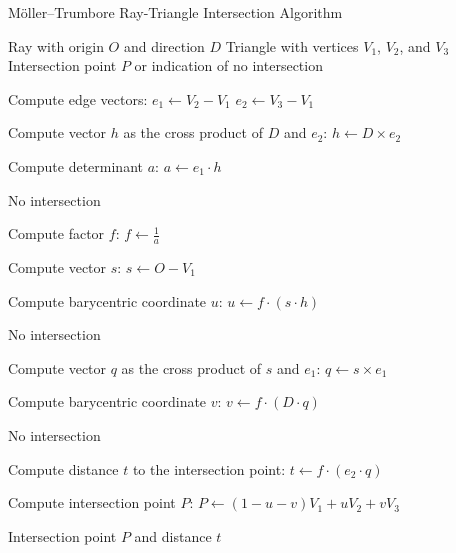 \documentclass[11pt, a4paper,oneside,chapterprefix=false]{scrbook}
\begin{document}
\vspace{10pt}

\begin{algorithm}[H]
\caption{Möller–Trumbore Ray-Triangle Intersection Algorithm}\label{alg:ray_triangle_intersection}
\begin{algorithmic}
\Require Ray with origin \( O \) and direction \( D \)
\Require Triangle with vertices \( V_1 \), \( V_2 \), and \( V_3 \)
\Ensure Intersection point \( P \) or indication of no intersection

\State Compute edge vectors:
\State \hspace{0.5cm} \( e_1 \gets V_2 - V_1 \)
\State \hspace{0.5cm} \( e_2 \gets V_3 - V_1 \)

\State Compute vector \( h \) as the cross product of \( D \) and \( e_2 \):
\State \hspace{0.5cm} \( h \gets D \times e_2 \)

\State Compute determinant \( a \):
\State \hspace{0.5cm} \( a \gets e_1 \cdot h \)

    \State \Return No intersection  
\EndIf

\State Compute factor \( f \):
\State \hspace{0.5cm} \( f \gets \frac{1}{a} \)

\State Compute vector \( s \):
\State \hspace{0.5cm} \( s \gets O - V_1 \)

\State Compute barycentric coordinate \( u \):
\State \hspace{0.5cm} \( u \gets f \cdot (s \cdot h) \)

    \State \Return No intersection
\EndIf

\State Compute vector \( q \) as the cross product of \( s \) and \( e_1 \):
\State \hspace{0.5cm} \( q \gets s \times e_1 \)

\State Compute barycentric coordinate \( v \):
\State \hspace{0.5cm} \( v \gets f \cdot (D \cdot q) \)

    \State \Return No intersection
\EndIf

\State Compute distance \( t \) to the intersection point:
\State \hspace{0.5cm} \( t \gets f \cdot (e_2 \cdot q) \)

\State Compute intersection point \( P \):
\State \hspace{0.5cm} \( P \gets (1 - u - v) V_1 + u V_2 + v V_3 \)

\State \Return Intersection point \( P \) and distance \( t \)
\end{algorithmic}
\end{algorithm}
\end{document}

